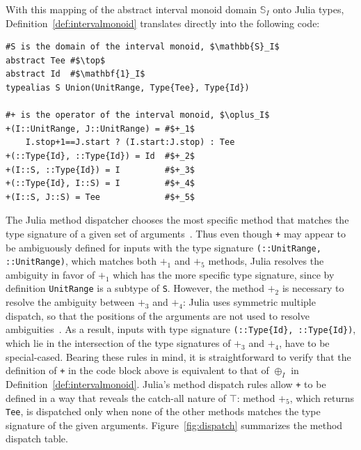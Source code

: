 \documentclass{sig-alternate}
\newcommand{\code}[1]{\texttt{#1}}
\begin{document}
With this mapping of the abstract interval monoid domain $\mathbb S_I$ onto
Julia types, Definition~\ref{def:intervalmonoid} translates directly into the
following code:

\begin{verbatim}
#S is the domain of the interval monoid, $\mathbb{S}_I$
abstract Tee #$\top$
abstract Id  #$\mathbf{1}_I$
typealias S Union(UnitRange, Type{Tee}, Type{Id})

#+ is the operator of the interval monoid, $\oplus_I$
+(I::UnitRange, J::UnitRange) = #$+_1$ 
    I.stop+1==J.start ? (I.start:J.stop) : Tee
+(::Type{Id}, ::Type{Id}) = Id  #$+_2$
+(I::S, ::Type{Id}) = I         #$+_3$
+(::Type{Id}, I::S) = I         #$+_4$
+(I::S, J::S) = Tee             #$+_5$
\end{verbatim}

The Julia method dispatcher chooses the most specific method that matches the
type signature of a given set of arguments~\cite{Bezanson2012}. Thus even
though \code{+} may appear to be ambiguously defined for inputs with the type
signature \code{(::Unit\-Range, ::UnitRange)}, which matches both $+_1$ and $+_5$
methods, Julia resolves the ambiguity in favor of $+_1$ which has the more
specific type signature, since by definition \code{UnitRange} is a subtype of
\code{S}. However, the method $+_2$ is necessary to resolve the ambiguity
between $+_3$ and $+_4$: Julia uses symmetric multiple dispatch, so that the
positions of the arguments are not used to resolve
ambiguities~\cite{Bezanson2012}. As a result, inputs with type signature
\code{(::Type\{Id\}, ::Type\{Id\})}, which lie in the intersection of the type
signatures of $+_3$ and $+_4$, have to be special-cased. Bearing these rules in
mind, it is straightforward to verify that the definition of \code{+} in the
code block above is equivalent to that of $\oplus_I$ in
Definition~\ref{def:intervalmonoid}. Julia's method dispatch rules allow
\code{+} to be defined in a way that reveals the catch-all nature of $\top$:
method $+_5$, which returns \code{Tee}, is dispatched only when none of the
other methods matches the type signature of the given arguments.
Figure~\ref{fig:dispatch} summarizes the method dispatch table.
\end{document}

